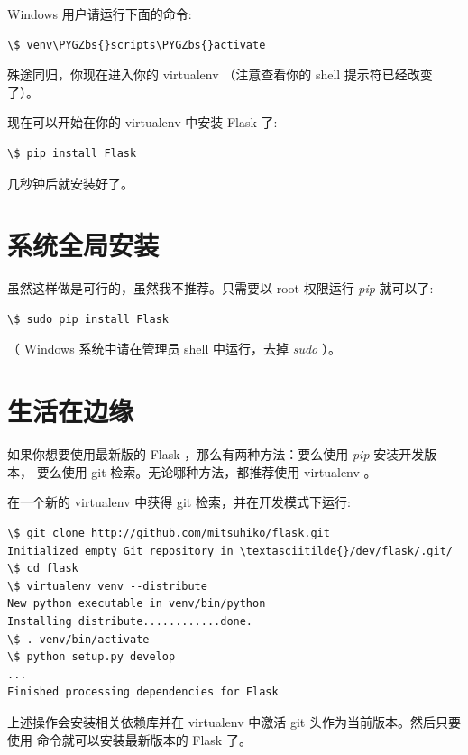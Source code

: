 \documentclass[a4paper,12pt]{sphinxmanual}
\def\PYGZbs{\char`\\}
\begin{document}
Windows 用户请运行下面的命令:

\begin{Verbatim}[commandchars=\\\{\}]
\$ venv\PYGZbs{}scripts\PYGZbs{}activate
\end{Verbatim}

殊途同归，你现在进入你的 virtualenv （注意查看你的 shell 提示符已经改变了）。

现在可以开始在你的 virtualenv 中安装 Flask 了:

\begin{Verbatim}[commandchars=\\\{\}]
\$ pip install Flask
\end{Verbatim}

几秒钟后就安装好了。


\section{系统全局安装}
\label{installation:id3}
虽然这样做是可行的，虽然我不推荐。只需要以 root 权限运行 \emph{pip} 就可以了:

\begin{Verbatim}[commandchars=\\\{\}]
\$ sudo pip install Flask
\end{Verbatim}

（ Windows 系统中请在管理员 shell 中运行，去掉 \emph{sudo} ）。


\section{生活在边缘}
\label{installation:id4}
如果你想要使用最新版的 Flask ，那么有两种方法：要么使用 \emph{pip} 安装开发版本，
要么使用 git 检索。无论哪种方法，都推荐使用 virtualenv 。

在一个新的 virtualenv 中获得 git 检索，并在开发模式下运行:

\begin{Verbatim}[commandchars=\\\{\}]
\$ git clone http://github.com/mitsuhiko/flask.git
Initialized empty Git repository in \textasciitilde{}/dev/flask/.git/
\$ cd flask
\$ virtualenv venv --distribute
New python executable in venv/bin/python
Installing distribute............done.
\$ . venv/bin/activate
\$ python setup.py develop
...
Finished processing dependencies for Flask
\end{Verbatim}

上述操作会安装相关依赖库并在 virtualenv 中激活 git 头作为当前版本。然后只要
使用  命令就可以安装最新版本的 Flask 了。
\end{document}
